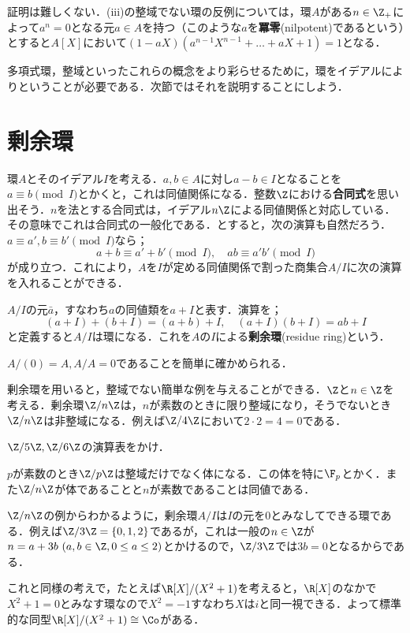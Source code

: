 証明は難しくない．(iii)の整域でない環の反例については，環$A$がある$n\in\Z_+$によって$a^n=0$となる元$a\in A$を持つ（このような$a$を\textbf{冪零}(nilpotent)であるという）とすると$A[X]$において$(1-aX)(a^{n-1}X^{n-1}+\dots+aX+1)=1$となる．

多項式環，整域といったこれらの概念をより彩らせるために，環をイデアルによりということが必要である．次節ではそれを説明することにしよう．

\section{剰余環}

環$A$とそのイデアル$I$を考える．$a,b\in A$に対し$a-b\in I$となることを$a\equiv b \pmod I$とかくと，これは同値関係になる．整数$\Z$における\textbf{合同式}を思い出そう．$n$を法とする合同式は，イデアル$n\Z$による同値関係と対応している．その意味でこれは合同式の一般化である．とすると，次の演算も自然だろう．$a\equiv a',b\equiv b'\pmod I$なら；
\[a+b\equiv a'+b'\pmod I,\quad ab\equiv a'b'\pmod I\]
が成り立つ．これにより，$A$を$I$が定める同値関係で割った商集合$A/I$に次の演算を入れることができる．

\begin{defi}[剰余環]
	$A/I$の元$\bar{a}$，すなわち$a$の同値類を$a+I$と表す．演算を；
	\[(a+I)+(b+I)=(a+b)+I,\quad (a+I)(b+I)=ab+I\]
	と定義すると$A/I$は環になる．これを$A$の$I$による\textbf{剰余環}(residue ring)という．
\end{defi}

$A/(0)=A, A/A=0$であることを簡単に確かめられる．

剰余環を用いると，整域でない簡単な例を与えることができる．$\Z$と$n\in\Z$を考える．剰余環$\Z/n\Z$は，$n$が素数のときに限り整域になり，そうでないとき$\Z/n\Z$は非整域になる．例えば$\Z/4\Z$において$2\cdot 2=4=0$である．

\begin{exer}
	$\Z/5\Z, \Z/6\Z$の演算表をかけ．
\end{exer}

$p$が素数のとき$\Z/p\Z$は整域だけでなく体になる．この体を特に$\F_p$とかく．また$\Z/n\Z$が体であることと$n$が素数であることは同値である．

$\Z/n\Z$の例からわかるように，剰余環$A/I$は$I$の元を0とみなしてできる環である．例えば$\Z/3\Z=\{0,1,2\}$であるが，これは一般の$n\in\Z$が$n=a+3b~(a,b\in\Z, 0\leq a\leq 2)$とかけるので，$\Z/3\Z$では$3b=0$となるからである．

これと同様の考えで，たとえば$\R[X]/(X^2+1)$を考えると，$\R[X]$のなかで$X^2+1=0$とみなす環なので$X^2=-1$すなわち$X$は$i$と同一視できる．よって標準的な同型$\R[X]/(X^2+1)\cong\Co$がある．

